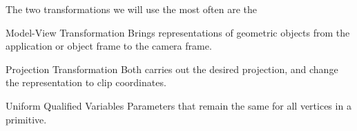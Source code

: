 \documentclass[../COS3712_Notes.tex]{subfiles}
\begin{document}
      The two transformations we will use the most often are the
      \begin{descriptimize}
        \item[Model-View Transformation] Brings representations of geometric objects
          from the application or object frame to the camera frame.
        \item[Projection Transformation] Both carries out the desired projection,
          and change the representation to clip coordinates.
      \end{descriptimize}

      \begin{definition}{Uniform Qualified Variables}
        Parameters that remain the same for all vertices in a primitive.
      \end{definition}

\end{document}
